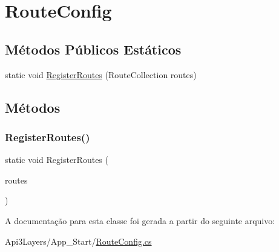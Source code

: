 \hypertarget{classApi3Layers_1_1RouteConfig}{}\section{Route\+Config}
\label{classApi3Layers_1_1RouteConfig}
\subsection*{Métodos Públicos Estáticos}
\begin{DoxyCompactItemize}
\item 
static void \hyperlink{classApi3Layers_1_1RouteConfig_a11e22f7991e945338ef5051492f404a9}{Register\+Routes} (Route\+Collection routes)
\end{DoxyCompactItemize}


\subsection{Métodos}
\mbox{\label{classApi3Layers_1_1RouteConfig_a11e22f7991e945338ef5051492f404a9}} 
\subsubsection{\texorpdfstring{Register\+Routes()}{RegisterRoutes()}}
{\footnotesize\ttfamily static void Register\+Routes (\begin{DoxyParamCaption}\item[{Route\+Collection}]{routes }\end{DoxyParamCaption})\hspace{0.3cm}{\ttfamily [static]}}



A documentação para esta classe foi gerada a partir do seguinte arquivo\+:\begin{DoxyCompactItemize}
\item 
Api3\+Layers/\+App\+\_\+\+Start/\hyperlink{RouteConfig_8cs}{Route\+Config.\+cs}\end{DoxyCompactItemize}
